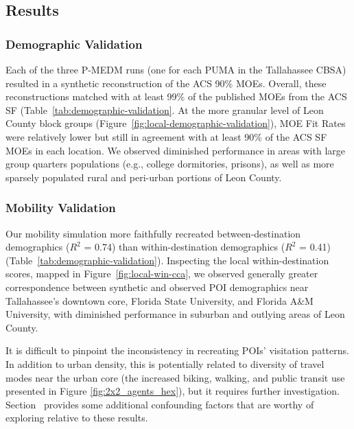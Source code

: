 \subsection{Results}\label{section:results}

\subsubsection{Demographic Validation}





Each of the three P-MEDM runs (one for each PUMA in the Tallahassee CBSA) resulted in a synthetic reconstruction of the ACS 90\% MOEs. Overall, these reconstructions matched with at least 99\% of the published MOEs from the ACS SF (Table~\ref{tab:demographic-validation}. At the more granular level of Leon County block groups (Figure~\ref{fig:local-demographic-validation}), MOE Fit Rates were relatively lower but still in agreement with at least 90\% of the ACS SF MOEs in each location. We observed diminished performance in areas with large group quarters populations (e.g., college dormitories, prisons), as well as more sparsely populated rural and peri-urban portions of Leon County. 

\subsubsection{Mobility Validation}



Our mobility simulation more faithfully recreated between-destination demographics ($R^2$ = 0.74) than within-destination demographics ($R^2$ = 0.41) (Table~\ref{tab:demographic-validation}). Inspecting the local within-destination scores, mapped in Figure~\ref{fig:local-win-cca}, we observed generally greater correspondence between synthetic and observed POI demographics near Tallahassee's downtown core, Florida State University, and Florida A\&M University, with diminished performance in suburban and outlying areas of Leon County. 

It is difficult to pinpoint the inconsistency in recreating POIs' visitation patterns. In addition to urban density, this is potentially related to diversity of travel modes near the urban core (the increased biking, walking, and public transit use presented in Figure \ref{fig:2x2_agents_hex}), but it requires further investigation. Section~ provides some additional confounding factors that are worthy of exploring relative to these results.

